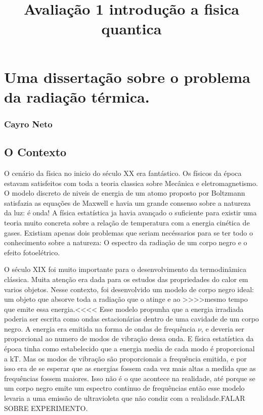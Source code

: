 \documentclass[11pt]{article}
\title{Avaliação 1 introdução a fisica quantica}
\begin{document}
    
    \maketitle
    
    

    
    \hypertarget{uma-dissertauxe7uxe3o-sobre-o-problema-da-radiauxe7uxe3o-tuxe9rmica.}{%
\section{Uma dissertação sobre o problema da radiação
térmica.}\label{uma-dissertauxe7uxe3o-sobre-o-problema-da-radiauxe7uxe3o-tuxe9rmica.}}

\hypertarget{cayro-neto}{%
\subsubsection{Cayro Neto}\label{cayro-neto}}

    \hypertarget{o-contexto}{%
\subsection{O Contexto}\label{o-contexto}}

O cenário da física no inicio do século XX era fantástico. Os físicos da
época estavam satisfeitos com toda a teoria classica sobre Mecânica e
eletromagnetismo. O modelo discreto de niveis de energia de um atomo
proposto por Boltzmann satisfazia as equações de Maxwell e havia um
grande consenso sobre a natureza da luz: é onda! A física estatística ja
havia avançado o suficiente para existir uma teoria muito concreta sobre
a relação de temperatura com a energia cinética de gases. Existiam
apenas dois problemas que seriam necéssarios para se ter todo o
conhecimento sobre a natureza: O espectro da radiação de um corpo negro
e o efeito fotoelétrico.

O século XIX foi muito importante para o desenvolvimento da
termodinâmica clássica. Muita atenção era dada para os estudos das
propriedades do calor em varios objetos. Nesse contexto, foi
desenvolvido um modelo de corpo negro ideal: um objeto que absorve toda
a radiação que o atinge e ao
\textgreater{}\textgreater{}\textgreater{}\textgreater{}mesmo tempo que
emite essa energia.\textless{}\textless{}\textless{}\textless{} Esse
modelo propunha que a energia irradiada poderia ser escrita como ondas
estacionárias dentro de uma cavidade de um corpo negro. A energia era
emitida na forma de ondas de frequência \(\nu\), e deveria ser
proporcional ao numero de modos de vibração dessa onda. E física
estatística da época tinha como estabelecido que a energia media de cada
modo é proporcional a kT. Mas os modos de vibração são proporcionais a
frequência emitida, e por isso era de se esperar que as energias fossem
cada vez mais altas a medida que as frequências fossem maiores. Isso não
é o que acontece na realidade, até porque se um corpo negro emite um
espectro continuo de frequências então esse modelo levaria a uma emissão
de ultravioleta que não condiz com a realidade.FALAR SOBRE EXPERIMENTO.
\end{document}
